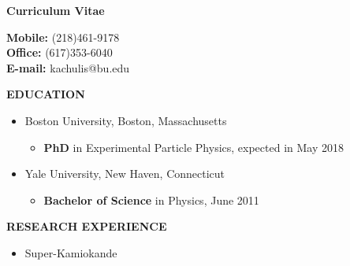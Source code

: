 \thispagestyle{plain}

\begin{singlespace}

\centerline{\LARGE\bf Curriculum Vitae}
\vspace{0.5in}

\vspace{0.5cm}

\noindent
{} 
{\bf Mobile:} (218)461-9178\\
{\bf Office:} (617)353-6040\\
{\bf E-mail:} kachulis@bu.edu

\begin{comment}
\noindent
590 Commonwealth Avenue\\
Department of Physics\\
Boston University\\
Boston, MA 02215, U.S.A.\\
(617)224-7377\\
dgastler@bu.edu
\end{comment}

\vspace{0.5cm}
\noindent
{\bf EDUCATION}

\begin{itemize}

\item Boston University, Boston, Massachusetts
  \begin{itemize}
  \item {\bf PhD} in Experimental Particle Physics, expected in May 2018
  \end{itemize}

\item Yale University, New Haven, Connecticut
  \begin{itemize}
  \item {\bf Bachelor of Science} in Physics, June 2011
  \end{itemize}

\end{itemize}  

\noindent
{\bf RESEARCH EXPERIENCE}

\begin{itemize}
  
\item Super-Kamiokande
  \begin{itemize}


\end{itemize}
\end{itemize}
\end{singlespace}

